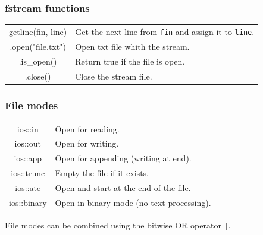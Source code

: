 \documentclass[5pt]{article}
\begin{document}
\begin{multicols}{2}
\subsubsection{fstream functions}
\begin{tabular}{C L}
getline(fin, line)      & Get the next line from \texttt{fin} and assign it to \texttt{line}. \\
.open("file.txt")    & Open txt file whith the stream. \\
.is\_open()          & Return true if the file is open. \\
.close()             & Close the stream file. \\

\end{tabular}


\subsubsection{File modes}
\begin{tabular}{C L}
ios::in        & Open for reading.\\
ios::out       & Open for writing.\\
ios::app       & Open for appending (writing at end).\\
ios::trunc     & Empty the file if it exists.\\
ios::ate       & Open and start at the end of the file.\\
ios::binary    & Open in binary mode (no text processing).\\
\end{tabular}

\footnotesize{File modes can be combined using the bitwise OR operator \texttt{|}.}



\end{multicols}
\end{document}
